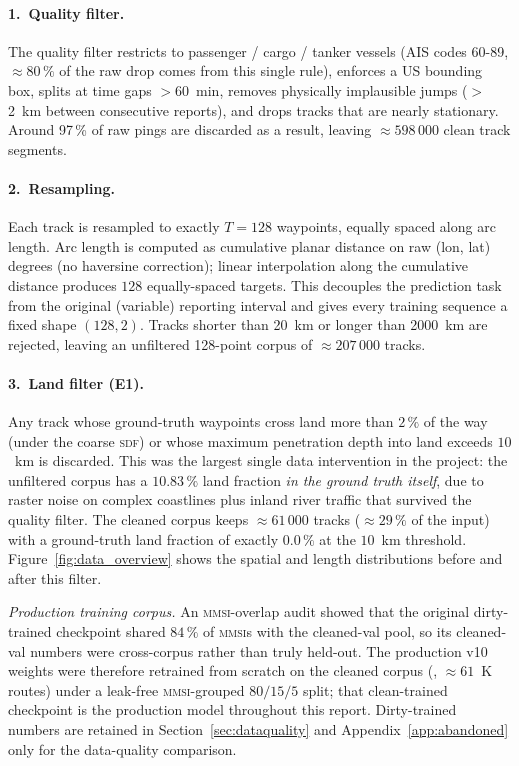 \documentclass[oneside, a4paper, onecolumn, 11pt]{article}
\newcommand{\sdf}{\textsc{sdf}}
\DeclareRobustCommand{\fpath}{\path}
\begin{document}
\paragraph{1.~Quality filter.}
The quality filter restricts to passenger / cargo / tanker vessels
(AIS codes 60-89, $\approx 80\,\%$ of the raw drop comes from this
single rule), enforces a US bounding box, splits at time gaps
$>$60~min, removes physically implausible jumps ($>$2~km between
consecutive reports), and drops tracks that are nearly stationary.
Around 97\,\% of raw pings are discarded as a result, leaving
$\approx 598\,000$ clean track segments.

\paragraph{2.~Resampling.}
Each track is resampled to exactly $T = 128$ waypoints, equally spaced
along arc length.  Arc length is computed as cumulative planar distance
on raw (lon, lat) degrees (no haversine correction); linear
interpolation along the cumulative distance produces $128$
equally-spaced targets.  This decouples the prediction task from the
original (variable) reporting interval and gives every training
sequence a fixed shape $(128, 2)$.  Tracks shorter than 20~km or
longer than 2000~km are rejected, leaving an unfiltered 128-point
corpus of $\approx 207\,000$ tracks.

\paragraph{3.~Land filter (E1).}
Any track whose ground-truth waypoints cross land more than $2\,\%$ of
the way (under the coarse \sdf) or whose maximum penetration depth
into land exceeds $10$~km is discarded.  This was the largest single
data intervention in the project: the unfiltered corpus has a
$10.83\,\%$ land fraction \emph{in the ground truth itself}, due to
raster noise on complex coastlines plus inland river traffic that
survived the quality filter.  The cleaned corpus keeps
$\approx 61\,000$ tracks ($\approx 29\,\%$ of the input) with a
ground-truth land fraction of exactly $0.0\,\%$ at the $10$~km
threshold.  Figure~\ref{fig:data_overview} shows the spatial and
length distributions before and after this filter.

\emph{Production training corpus.}
An \textsc{mmsi}-overlap audit showed that the original dirty-trained
checkpoint shared $84\,\%$ of \textsc{mmsi}s with the cleaned-val
pool, so its cleaned-val numbers were cross-corpus rather than truly
held-out.  The production v10 weights were therefore retrained from
scratch on the cleaned corpus (\fpath{trajgen_128_clean.npz},
$\approx 61$~K routes) under a leak-free \textsc{mmsi}-grouped
$80/15/5$ split; that clean-trained checkpoint is the production
model throughout this report.  Dirty-trained numbers are retained in
Section~\ref{sec:dataquality} and Appendix~\ref{app:abandoned} only
for the data-quality comparison.
\end{document}

